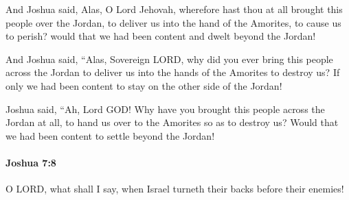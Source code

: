 			\begin{versebox}
					\item[BHS] 
					\item[ASV] And Joshua said, Alas, O Lord Jehovah, wherefore hast thou at all brought this people over the Jordan, to deliver us into the hand of the Amorites, to cause us to perish? would that we had been content and dwelt beyond the Jordan!
					\item[NIV] And Joshua said, “Alas, Sovereign LORD, why did you ever bring this people across the Jordan to deliver us into the hands of the Amorites to destroy us? If only we had been content to stay on the other side of the Jordan!
					\item[NRSV] Joshua said, “Ah, Lord GOD! Why have you brought this people across the Jordan at all, to hand us over to the Amorites so as to destroy us? Would that we had been content to settle beyond the Jordan!
			\end{versebox}

		\paragraph{Joshua 7:8} %
			\label{JOSHUA-7-8}

			O LORD, what shall I say, when Israel turneth their backs before their enemies!


